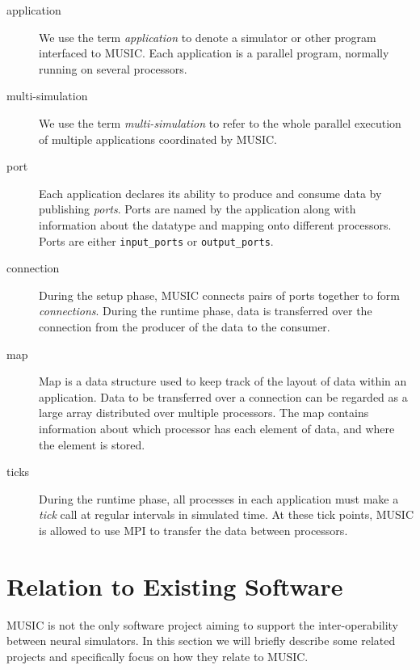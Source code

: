 \documentclass[a4paper]{report}
\begin{document}
\begin{description}
\item[application] We use the term
  \emph{application} to denote a simulator or other
  program interfaced to MUSIC.  Each application is a parallel
  program, normally running on several processors.

\item[multi-simulation] We use the term
  \emph{multi-simulation} to refer to the
  whole parallel execution of multiple applications coordinated by
  MUSIC.

\item[port] Each application declares its ability to produce and
  consume data by publishing \emph{ports}.  Ports are
  named by the application along with information about the datatype
  and mapping onto different processors.  Ports are either
  \lstinline|input_ports| or
  \lstinline|output_ports|.

\item[connection] During the setup phase, MUSIC connects pairs of
  ports together to form \emph{connections}.  During
  the runtime phase, data is transferred over the connection from the
  producer of the data to the consumer.

\item[map] Map is a data structure used to keep track of
  the layout of data within an application.  Data to be transferred
  over a connection can be regarded as a large array distributed over
  multiple processors.  The map contains information about which
  processor has each element of data, and where the element is stored.

\item[ticks] During the runtime phase, all processes in each
  application must make a \emph{tick} call at regular
  intervals in simulated time.  At these tick points, MUSIC is allowed
  to use MPI to transfer the data between processors.
\end{description}


\section{Relation to Existing Software}

MUSIC is not the only software project aiming to support the
inter-operability between neural simulators.  In this section we will
briefly describe some related projects and specifically focus on how
they relate to MUSIC.
\end{document}
